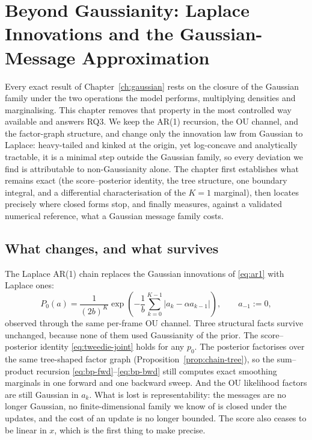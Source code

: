 \chapter{Beyond Gaussianity: Laplace Innovations and the Gaussian-Message
Approximation}\label{ch:laplace}\label{sec:bp-nongaussian}

Every exact result of Chapter~\ref{ch:gaussian} rests on the closure of
the Gaussian family under the two operations the model performs,
multiplying densities and marginalising. This chapter removes that
property in the most controlled way available and answers RQ3. We keep
the AR(1) recursion, the OU channel, and the factor-graph structure, and
change only the innovation law from Gaussian to Laplace: heavy-tailed and
kinked at the origin, yet log-concave and analytically tractable, it is a
minimal step outside the Gaussian family, so every deviation we find is
attributable to non-Gaussianity alone. The chapter first establishes what
remains exact (the score--posterior identity, the tree structure, one
boundary integral, and a differential characterisation of the $K=1$
marginal), then locates precisely where closed forms stop, and finally
measures, against a validated numerical reference, what a Gaussian
message family costs.

\section{What changes, and what survives}\label{sec:l-model}

The Laplace AR(1) chain replaces the Gaussian innovations of
\eqref{eq:ar1} with Laplace ones:
\begin{equation}
  P_0(a) = \frac{1}{(2b)^K}
  \exp\!\left( -\frac{1}{b} \sum_{k=0}^{K-1}
    \big| a_k - \alpha a_{k-1} \big| \right),
  \qquad a_{-1} := 0 ,
  \label{eq:l-chain-prior}
\end{equation}
observed through the same per-frame OU channel. Three structural facts
survive unchanged, because none of them used Gaussianity of the prior.
The score--posterior identity \eqref{eq:tweedie-joint} holds for any
$p_0$. The posterior factorises over the same tree-shaped factor graph
(Proposition~\ref{prop:chain-tree}), so the sum--product recursion
\eqref{eq:bp-fwd}--\eqref{eq:bp-bwd} still computes exact smoothing
marginals in one forward and one backward sweep. And the OU likelihood
factors are
still Gaussian in $a_k$. What is lost is representability: the messages
are no longer Gaussian, no finite-dimensional family we know of is closed
under the updates, and the cost of an update is no longer bounded. The
score also ceases to be linear in $x$, which is the first thing to make
precise.

